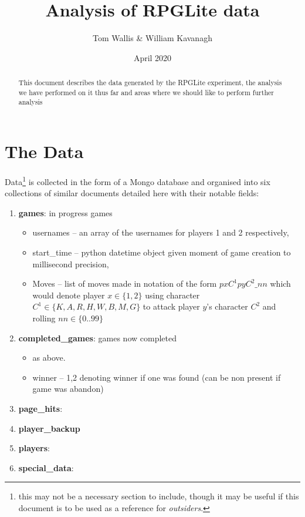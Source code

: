 \documentclass{tufte-handout}
\title{Analysis of RPGLite data}
\author[]{Tom Wallis \& William Kavanagh}
\date{April 2020}  %
\begin{document}
\maketitle%

\begin{abstract}
\noindent This document describes the data generated by the RPGLite experiment, the analysis we have performed on it thus far and areas where we should like to perform further analysis
\end{abstract}


\section{The Data}


Data\footnote{this may not be a necessary section to include, though it may be useful if this document is to be used as a reference for \textit{outsiders}.} is collected in the form of a Mongo database and organised into six collections of similar documents detailed here with their notable fields:
\begin{enumerate}
    \item \textbf{games}: in progress games
    \begin{itemize}
        \item usernames -- an array of the usernames for players 1 and 2 respectively,
        \item start\_time -- python datetime object given moment of game creation to millisecond precision,
        \item Moves -- list of moves made in notation of the form $pxC^1pyC^2\_nn$ which would denote player $x \in \{1,2\}$ using character $C^1 \in \{K,A,R,H,W,B,M,G\}$  to attack player $y$'s character $C^2$ and rolling $nn \in \{0..99\}$ 
    \end{itemize}
    \item \textbf{completed\_games}: games now completed
        \begin{itemize}
        \item as above.
        \item winner -- {1,2} denoting winner if one was found (can be non present if game was abandon)
    \end{itemize}
    \item \textbf{page\_hits}:
    \item \textbf{player\_backup}
    \item \textbf{players}:
    \item \textbf{special\_data}:
\end{enumerate}
\end{document}

